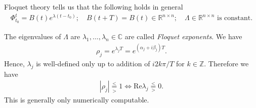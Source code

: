 Floquet theory tells us that the following holds in general
\begin{align}
	\boxed{
		\Phi_{t_0}^{t} = {B(t)} e^{\lambda(t-t_0)};\quad B(t+T) = B(t)\in \mathbb{R}^{n\times n};\quad \Lambda \in \mathbb{R}^{n\times n}  \textrm{ is constant} .
	}
\end{align}
\begin{definition}
	The eigenvalues of $\Lambda$ are $\lambda_1,\ldots,\lambda_n\in \mathbb{C}$ are called \emph{Floquet exponents}. We have
	\begin{align}
		\boxed{
			\rho_j = e^{\lambda_j T} = e^{(\alpha_j + i \beta_j)T}.
		}
	\end{align}
	Hence, $\lambda_j$ is well-defined only up to addition of $i2k\pi /T$ for $k \in \mathbb{Z}$. Therefore we have 
	\begin{align}
		|\rho_j| \underset{>}{\overset{<}{=}}1 \Leftrightarrow  \textrm{Re} \lambda _j \overset{<}{\underset{>}{=}} 0.	
	\end{align}
This is generally only numerically computable.	
\end{definition}

